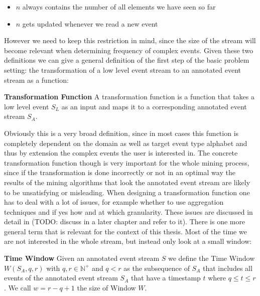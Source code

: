 \begin{itemize}
	\item $n$ always contains the number of all elements we have seen so far
	\item $n$ gets updated whenever we read a new event
\end{itemize}

However we need to keep this restriction in mind, since the size of the stream will become relevant when determining frequency of complex events.
Given these two definitions we can give a general definition of the first step of the basic problem setting: the transformation of a low level event stream to an annotated event stream as a function:

\begin{mydef}
\textbf{Transformation Function} A transformation function is a function that takes a low level event $S_L$ as an input and maps it to a corresponding annotated event stream $S_A$.
\end{mydef}
Obviously this is a very broad definition, since in most cases this function is completely dependent on the domain as well as target event type alphabet and thus by extension the complex events the user is interested in. The concrete transformation function though is very important for the whole mining process, since if the transformation is done incorrectly or not in an optimal way the results of the mining algorithms that look the annotated event stream are likely to be unsatisfying or misleading. When designing a transformation function one has to deal with a lot of issues, for example whether to use aggregation techniques and if yes how and at which granularity. These issues are discussed in detail in (TODO: discuss in a later chapter and refer to it). \newline
There is one more general term that is relevant for the context of this thesis. Most of the time we are not interested in the whole stream, but instead only look at a small window:

\begin{mydef}
\textbf{Time Window} Given an annotated event stream $S$ we define the Time Window $W(S_A,q,r)$ with $q,r \in \mathbb{N}^+$ and $q < r$ as the subsequence of $S_A$ that includes all events of the annotated event stream $S_A$ that have a timestamp $t$ where $q \leq t\leq r$. We call $w = r-q+1$ the size of Window $W$.
\end{mydef}

